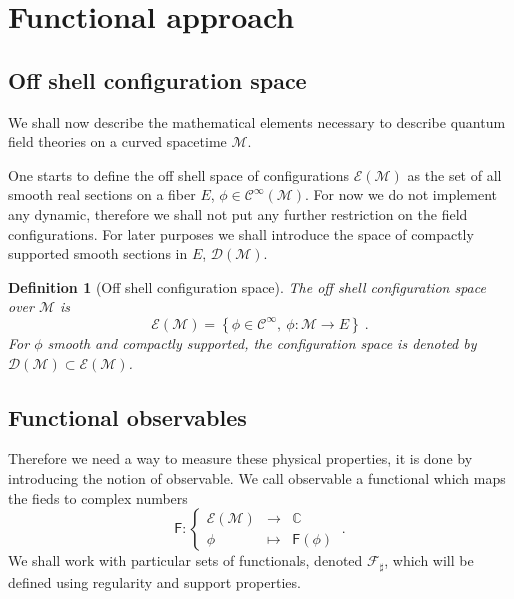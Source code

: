 \documentclass[11pt]{book}
\newcommand{\Ccal}{\mathcal{C}}
\newcommand{\Dcal}{\mathcal{D}}
\newcommand{\Ecal}{\mathcal{E}}
\newcommand{\Fcal}{\mathcal{F}}
\newcommand{\Mcal}{\mathcal{M}}
\newcommand{\Cbb}{\mathbb{C}}
\newcommand{\Fsf}{\mathsf{F}}
\theoremstyle{break}
\newtheorem{definition}{Definition}
\begin{document}
\section{Functional approach}

\subsection{Off shell configuration space}

We shall now describe the mathematical elements necessary to describe quantum field theories on a curved spacetime $\Mcal$. %

%
One starts to define the off shell space of configurations $\Ecal(\Mcal)$ as the set of all smooth real sections on a fiber $E$, $\phi \in \Ccal^\infty\left(\Mcal\right)$. For now we do not implement any dynamic, therefore we shall not put any further restriction on the field configurations. %
%
For later purposes we shall introduce the space of compactly supported smooth sections in $E$, $\Dcal(\Mcal)$.\par%
%
\begin{definition}[Off shell configuration space]
The off shell configuration space over $\Mcal$ is 
%
\begin{equation*}
\Ecal(\Mcal) = \left\{ \phi \in \Ccal^\infty, \  \phi : \Mcal \to E \right\} \ .
\end{equation*}
%
For $\phi$ smooth and compactly supported, the configuration space is denoted by $\Dcal(\Mcal) \subset \Ecal(\Mcal)$.
\end{definition}


\subsection{Functional observables}

Therefore we need a way to measure these physical properties, it is done by introducing the notion of observable. We call observable a functional which maps the fieds to complex numbers%
%
\begin{equation*}
\Fsf : \left\{
\begin{array}{ccc}
\Ecal(\Mcal) & \to     & \Cbb \\
\phi  & \mapsto & \Fsf(\phi)
\end{array}
\right. \ .
\end{equation*}
%
We shall work with particular sets of functionals, denoted $\Fcal_\sharp$, which will be defined using regularity and support properties. \par%
\end{document}
